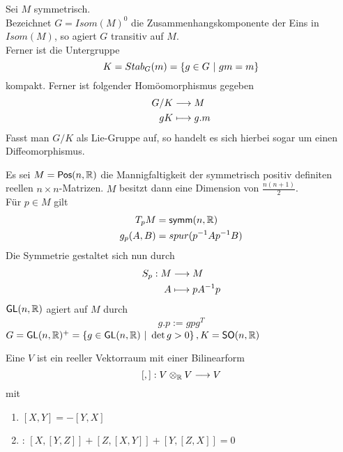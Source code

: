 \documentclass{book}
\newcommand{\GL}{\textsf{GL}(n,\R)}
\newcommand{\SO}{\textsf{SO}(n,\R)}
\newcommand{\POS}{\textsf{Pos}(n,\R)}
\newcommand{\symm}{\textsf{symm}(n,\R)}
\begin{document}
\Kor{}
Sei $M$ symmetrisch.\\
Bezeichnet $G = Isom(M)^0$ die Zusammenhangskomponente der Eins in $Isom(M)$, so agiert $G$ transitiv auf $M$.\\
Ferner ist die Untergruppe
\[ K = Stab_G(m) = \set{g \in G}{gm = m} \]
kompakt. Ferner ist folgender Homöomorphismus gegeben
\begin{align*}
G / K &\overset{}{\longrightarrow} M\\
gK &\longmapsto g.m
\end{align*}
Fasst man $G/K$ als Lie-Gruppe auf, so handelt es sich hierbei sogar um einen Diffeomorphismus.

\Bsp{}
Es sei $M = \POS$ die Mannigfaltigkeit der symmetrisch positiv definiten reellen $n\times n$-Matrizen. $M$ besitzt dann eine Dimension von $\frac{n(n+1)}{2}$.\\
Für $p \in M$ gilt
\begin{align*}
T_pM &= \symm\\
g_p(A,B) &=spur(p\i A p\i B)
\end{align*}
Die Symmetrie gestaltet sich nun durch
\begin{align*}
S_p : M &\overset{}{\longrightarrow} M\\
A &\longmapsto pA^{-1} p
\end{align*}
$\GL$ agiert auf $M$ durch
\begin{align*}
g.p := gpg^T
\end{align*}
$G = \GL^+ = \set{g \in \GL}{\det g > 0}, K = \SO$

\Def{}
Eine  $V$ ist ein reeller Vektorraum mit einer Bilinearform
\[ [,] : V\otimes_{\mathbb{R}} V \overset{}{\longrightarrow} V \]
mit
\begin{enumerate}[1.)]
\item $[X,Y] = -[Y,X]$
\item {}: $[X,[Y,Z]] + [Z,[X,Y]] + [Y,[Z,X]] = 0$
\end{enumerate}
\end{document}
